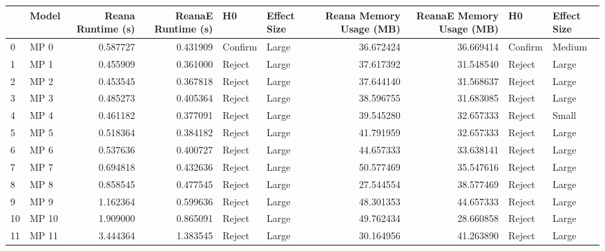 \begin{tabular}{llrrllrrll}
\toprule
{} &  Model &  Reana Runtime (s) &  ReanaE Runtime (s) &       H0 & Effect Size &  Reana Memory Usage (MB) &  ReanaE Memory Usage (MB) &       H0 & Effect Size \\
\midrule
0  &   MP 0 &           0.587727 &            0.431909 &  Confirm &       Large &                36.672424 &                 36.669414 &  Confirm &      Medium \\
1  &   MP 1 &           0.455909 &            0.361000 &   Reject &       Large &                37.617392 &                 31.548540 &   Reject &       Large \\
2  &   MP 2 &           0.453545 &            0.367818 &   Reject &       Large &                37.644140 &                 31.568637 &   Reject &       Large \\
3  &   MP 3 &           0.485273 &            0.405364 &   Reject &       Large &                38.596755 &                 31.683085 &   Reject &       Large \\
4  &   MP 4 &           0.461182 &            0.377091 &   Reject &       Large &                39.545280 &                 32.657333 &   Reject &       Small \\
5  &   MP 5 &           0.518364 &            0.384182 &   Reject &       Large &                41.791959 &                 32.657333 &   Reject &       Large \\
6  &   MP 6 &           0.537636 &            0.400727 &   Reject &       Large &                44.657333 &                 33.638141 &   Reject &       Large \\
7  &   MP 7 &           0.694818 &            0.432636 &   Reject &       Large &                50.577469 &                 35.547616 &   Reject &       Large \\
8  &   MP 8 &           0.858545 &            0.477545 &   Reject &       Large &                27.544554 &                 38.577469 &   Reject &       Large \\
9  &   MP 9 &           1.162364 &            0.599636 &   Reject &       Large &                48.301353 &                 44.657333 &   Reject &       Large \\
10 &  MP 10 &           1.909000 &            0.865091 &   Reject &       Large &                49.762434 &                 28.660858 &   Reject &       Large \\
11 &  MP 11 &           3.444364 &            1.383545 &   Reject &       Large &                30.164956 &                 41.263890 &   Reject &       Large \\

\end{tabular}
